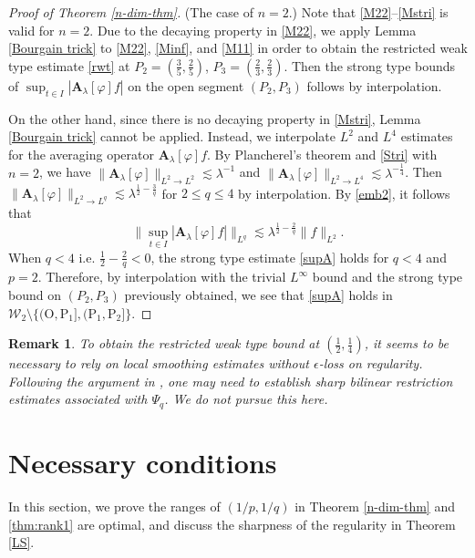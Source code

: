 \documentclass[10pt] %
{amsart}
\theoremstyle{plain}
\newtheorem{rmk}[thm]{Remark}
\numberwithin{equation}{section}
\begin{document}
\begin{proof}[Proof of Theorem \ref{n-dim-thm}]
\noindent(The case of $n=2$.)
Note that \eqref{M22}--\eqref{Mstri} is valid for $n=2$.
Due to the decaying property in \eqref{M22}, we apply Lemma \ref{Bourgain trick} to \eqref{M22}, \eqref{Minf}, and \eqref{M11} in order to obtain the restricted weak type estimate \eqref{rwt} at $P_2=(\frac35,\frac25)$, $P_3=(\frac23,\frac23)$. 
Then the strong type bounds of $\sup_{t\in I}|\mathbf A_\lambda[\varphi]f|$ on the open segment $(P_2, P_3)$ follows by interpolation.  


On the other hand, since there is no decaying property in \eqref{Mstri}, Lemma \ref{Bourgain trick} cannot be applied. 
Instead, we interpolate $L^2$ and $L^4$ estimates for the averaging operator $\mathbf A_\lambda[\varphi]f$. 
By Plancherel's theorem and \eqref{Stri} with $n=2$, we have $ 
\| \mathbf A_\lambda[\varphi]  \|_{L^2\to L^2} \lesssim \lambda^{-1} $ and $
\| \mathbf A_\lambda[\varphi] \|_{L^2 \to L^4} \lesssim \lambda^{-\frac 14} $.
Then  $\| \mathbf A_\lambda[\varphi] \|_{L^2 \to L^q} \lesssim \lambda^{\frac12-\frac 3q} $ for $2 \le q \le 4$ by interpolation.
By \eqref{emb2}, it follows that 
\[
\| \sup_{t\in I} |\mathbf A_\lambda[\varphi] f|  \|_{L^q } \lesssim \lambda^{\frac12-\frac 2q} \|f\|_{L^2}.  
\]
When $q < 4$ i.e. $\frac 12 -\frac 2q<0$, the strong type estimate \eqref{supA}  holds for $q <4$ and $p=2$.
Therefore, by interpolation with the trivial $L^\infty$ bound and the strong type bound on $(P_2, P_3)$ previously obtained, we see that \eqref{supA}  holds in  $\mathcal W_2 \setminus  \{ (\mathrm O, \mathrm P_1], (\mathrm P_1, \mathrm P_2] \}$.  
 \end{proof}



\begin{rmk} 
To obtain the restricted weak type bound at $(\frac 12,\frac14)$, it seems to be necessary to rely on local smoothing estimates without $\epsilon$-loss on regularity. 
Following the argument in \cite{Lee}, one may need to establish sharp bilinear restriction estimates associated with $\Psi_q$. We do not pursue this here. 
\end{rmk}




\section{Necessary conditions}\label{sec:sharpness}


In this section, we prove the ranges of $(1/p,1/q)$ in Theorem \ref{n-dim-thm} and \ref{thm:rank1} are optimal, and discuss the sharpness of the regularity in Theorem \ref{LS}.
\end{document}
